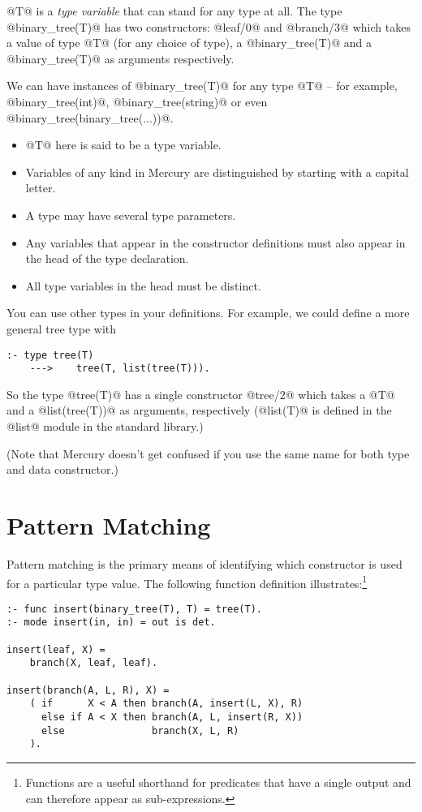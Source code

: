 @T@ is a \emph{type variable} that can stand for any type at all.
The type @binary_tree(T)@ has two constructors: @leaf/0@ and
@branch/3@ which takes a value of type @T@ (for any choice of
type), a @binary_tree(T)@ and a @binary_tree(T)@ as arguments
respectively.

We can have instances of @binary_tree(T)@ for any type @T@ -- for
example, @binary_tree(int)@, @binary_tree(string)@ or even
@binary_tree(binary_tree(...))@.

\begin{itemize}
\item @T@ here is said to be a type variable.
\item Variables of any kind in Mercury are distinguished by
  starting with a capital letter.
\item A type may have several type parameters.
\item Any variables that appear in the constructor definitions
  must also appear in the head of the type declaration.
\item All type variables in the head must be distinct.
\end{itemize}

You can use other types in your definitions.  For example, we
could define a more general tree type with
\begin{verbatim}
:- type tree(T)
    --->    tree(T, list(tree(T))).
\end{verbatim}
So the type @tree(T)@ has a single constructor @tree/2@ which
takes a @T@ and a @list(tree(T))@ as arguments, respectively
(@list(T)@ is defined in the @list@ module in the standard
library.)

(Note that Mercury doesn't get confused if you use the same
name for both type and data constructor.)


\section{Pattern Matching}

Pattern matching is the primary means of identifying which
constructor is used for a particular type value.  The
following function definition illustrates:\footnote{Functions are a useful shorthand for predicates
that have a single output and can therefore appear as
sub-expressions.}
\begin{verbatim}
:- func insert(binary_tree(T), T) = tree(T).
:- mode insert(in, in) = out is det.

insert(leaf, X) =
    branch(X, leaf, leaf).

insert(branch(A, L, R), X) =
    ( if      X < A then branch(A, insert(L, X), R)
      else if A < X then branch(A, L, insert(R, X))
      else               branch(X, L, R)
    ).
\end{verbatim}

